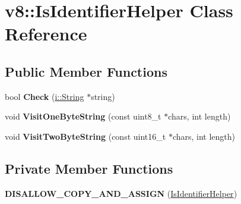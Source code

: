 \hypertarget{classv8_1_1_is_identifier_helper}{}\section{v8\+:\+:Is\+Identifier\+Helper Class Reference}
\label{classv8_1_1_is_identifier_helper}
\subsection*{Public Member Functions}
\begin{DoxyCompactItemize}
\item 
bool {\bfseries Check} (\hyperlink{classv8_1_1internal_1_1_string}{i\+::\+String} $\ast$string)\hypertarget{classv8_1_1_is_identifier_helper_a7f45789317c9a241fdc23e067b374a5a}{}\label{classv8_1_1_is_identifier_helper_a7f45789317c9a241fdc23e067b374a5a}

\item 
void {\bfseries Visit\+One\+Byte\+String} (const uint8\+\_\+t $\ast$chars, int length)\hypertarget{classv8_1_1_is_identifier_helper_aca716548f5a3d5488085fd813c64ed2d}{}\label{classv8_1_1_is_identifier_helper_aca716548f5a3d5488085fd813c64ed2d}

\item 
void {\bfseries Visit\+Two\+Byte\+String} (const uint16\+\_\+t $\ast$chars, int length)\hypertarget{classv8_1_1_is_identifier_helper_ae3661f5f0b52ac7040ebb990f23b8b17}{}\label{classv8_1_1_is_identifier_helper_ae3661f5f0b52ac7040ebb990f23b8b17}

\end{DoxyCompactItemize}
\subsection*{Private Member Functions}
\begin{DoxyCompactItemize}
\item 
{\bfseries D\+I\+S\+A\+L\+L\+O\+W\+\_\+\+C\+O\+P\+Y\+\_\+\+A\+N\+D\+\_\+\+A\+S\+S\+I\+GN} (\hyperlink{classv8_1_1_is_identifier_helper}{Is\+Identifier\+Helper})\hypertarget{classv8_1_1_is_identifier_helper_a464d937c2f53f0c834dd08abe59a4b10}{}\label{classv8_1_1_is_identifier_helper_a464d937c2f53f0c834dd08abe59a4b10}

\end{DoxyCompactItemize}
